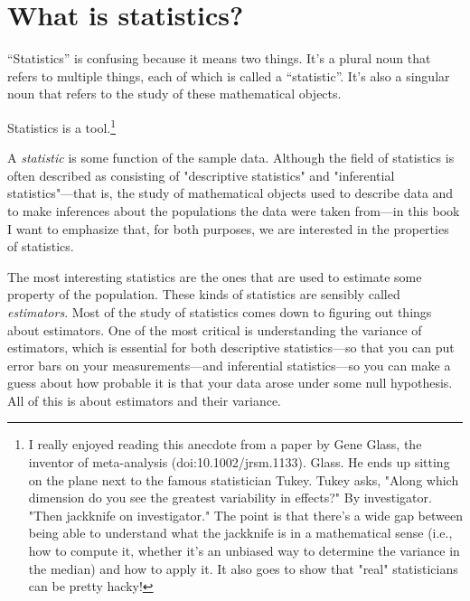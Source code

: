 \chapter{What is statistics?}

``Statistics'' is confusing because it means two things. It's a plural noun that
refers to multiple things, each of which is called a ``statistic''. It's also a
singular noun that refers to the study of these mathematical objects.

Statistics is a tool.\footnote{I really enjoyed reading this anecdote from a
paper by Gene Glass, the inventor of meta-analysis (doi:10.1002/jrsm.1133).
Glass. He ends up sitting on the plane next to the famous statistician
Tukey. Tukey asks, "Along which dimension do you see the greatest
variability in effects?" By investigator. "Then jackknife on investigator."
The point is that there's a wide gap between being able to understand what
the jackknife is in a mathematical sense (i.e., how to compute it, whether
it's an unbiased way to determine the variance in the median) and how to apply
it. It also goes to show that "real" statisticians can be pretty hacky!}

A \emph{statistic} is some function of the sample data. Although the field of
statistics is often described as consisting of "descriptive statistics" and
"inferential statistics"---that is, the study of mathematical objects used to
describe data and to make inferences about the populations the data were taken
from---in this book I want to emphasize that, for both purposes, we are
interested in the properties of statistics.

The most interesting statistics are the ones that are used to estimate some
property of the population. These kinds of statistics are sensibly called
\emph{estimators}. Most of the study of statistics comes down to figuring out things
about estimators. One of the most critical is understanding the variance of
estimators, which is essential for both descriptive statistics---so that you
can put error bars on your measurements---and inferential statistics---so you
can make a guess about how probable it is that your data arose under some null
hypothesis. All of this is about estimators and their variance.